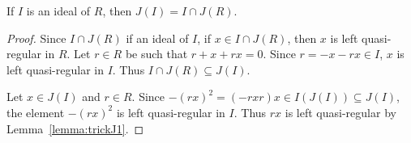 %

\begin{proposition}
	\label{proposition:J(I)}
	If $I$ is an ideal of $R$, then $J(I)=I\cap J(R)$. 
\end{proposition}

\begin{proof}
	Since $I\cap J(R)$ if an ideal of $I$, if $x\in I\cap J(R)$, then $x$ is
	left quasi-regular in $R$. Let $r\in R$ be such that $r+x+rx=0$. 
	Since $r=-x-rx\in I$, $x$ is left quasi-regular 
	in $I$. Thus $I\cap J(R)\subseteq J(I)$. 

	Let $x\in J(I)$ and $r\in R$. Since $-(rx)^2=(-rxr)x\in
	I(J(I))\subseteq J(I)$, the element $-(rx)^2$ is left quasi-regular 
	in $I$. Thus $rx$ is left quasi-regular by
	Lemma~\ref{lemma:trickJ1}.
\end{proof}

